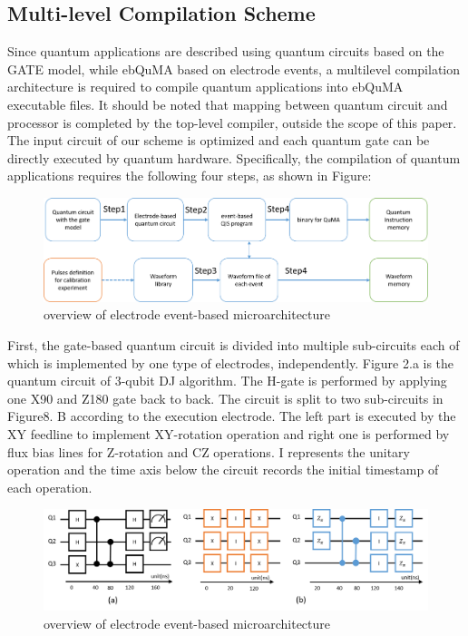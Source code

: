 \subsection{Multi-level Compilation Scheme}

Since quantum applications are described using quantum circuits based on the GATE model, 
while ebQuMA based on electrode events, a multilevel compilation architecture is required to compile quantum applications into ebQuMA executable files. 
It should be noted that mapping between quantum circuit and processor is completed by the top-level compiler, outside the scope of this paper. 
The input circuit of our scheme is optimized and each quantum gate can be directly executed by quantum hardware.
Specifically, the compilation of quantum applications requires the following four steps, as shown in Figure:
\begin{figure}[ht]
  \centering
  \includegraphics[width=\linewidth]{figure/4_8}
  \caption{overview of electrode event-based microarchitecture}
  \label{img7}
\end{figure}


First, the gate-based quantum circuit is divided into multiple sub-circuits each of which is implemented by one type of electrodes, independently. 
Figure 2.a is the quantum circuit of 3-qubit DJ algorithm. The H-gate is performed by applying one X90 and Z180 gate back to back. 
The circuit is split to two sub-circuits in Figure8. B according to the execution electrode. 
The left part is executed by the XY feedline to implement XY-rotation operation and right one is performed by flux bias lines for Z-rotation and CZ operations. 
I represents the unitary operation and the time axis below the circuit records the initial timestamp of each operation.
\begin{figure}[h]
  \centering
  \includegraphics[width=\linewidth]{figure/4_10}
  \caption{overview of electrode event-based microarchitecture}
  \label{img7}
\end{figure}


